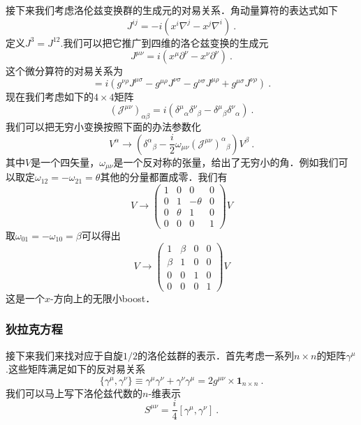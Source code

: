 接下来我们考虑洛伦兹变换群的生成元的对易关系．角动量算符的表达式如下
\begin{equation}
J^{ij} = -i (x^i\nabla^j- x^j\nabla^i)~.
\end{equation}
定义$J^3 = J^{12}$.我们可以把它推广到四维的洛仑兹变换的生成元
\begin{equation}
J^{\mu\nu} = i (x^\mu \partial^\nu - x^\nu \partial^\nu)~.
\end{equation}
这个微分算符的对易关系为
\begin{equation}
[J^{\mu\nu},J^{\rho\sigma}] = i (g^{\nu\rho}J^{\mu\sigma} - g^{\mu\rho}J^{\nu\sigma}-g^{\nu\sigma}J^{\mu\rho}+g^{\mu\sigma}J^{\nu\rho})~.
\end{equation}
现在我们考虑如下的$4\times 4$矩阵
\begin{equation}
(\mathcal J^{\mu\nu})_{\alpha\beta} = i (\delta^\mu{}_\alpha \delta^\nu{}_\beta - \delta^\mu{}_\beta \delta^\nu{}_\alpha)~.
\end{equation}
我们可以把无穷小变换按照下面的办法参数化
\begin{equation}
V^\alpha \rightarrow (\delta^\alpha{}_\beta - \frac{i}{2}\omega_{\mu\nu}(\mathcal J^{\mu\nu})^\alpha{}_\beta) V^\beta ~.
\end{equation}
其中$V$是一个四矢量，$\omega_{\mu\nu}$是一个反对称的张量，给出了无穷小的角．例如我们可以取定$\omega_{12}=-\omega_{21} = \theta$其他的分量都置成零．我们有
\begin{equation}
V \rightarrow \begin{pmatrix}
1 & 0 & 0 & 0 \\
0 & 1 & -\theta & 0 \\
0 & \theta & 1 & 0 \\
0 & 0 & 0 & 1
\end{pmatrix}
V
\end{equation}
取$\omega_{01} = -\omega_{10}=\beta$可以得出
\begin{equation}
V \rightarrow \begin{pmatrix}
1 & \beta & 0 & 0 \\
\beta & 1 & 0 & 0 \\
0 & 0 & 1 & 0 \\
0 & 0 & 0 & 1
\end{pmatrix}
V
\end{equation}
这是一个$x$-方向上的无限小boost．

\subsubsection{狄拉克方程}
接下来我们来找对应于自旋$1/2$的洛伦兹群的表示．首先考虑一系列$n\times n$的矩阵$\gamma^\mu$.这些矩阵满足如下的反对易关系
\begin{equation}
\{\gamma^\mu,\gamma^\nu\}\equiv\gamma^\mu\gamma^\nu+\gamma^\nu\gamma^\mu = 2 g^{\mu\nu} \times \boldsymbol{1}_{n\times n}~.
\end{equation}
我们可以马上写下洛伦兹代数的$n$-维表示
\begin{equation}
S^{\mu\nu} = \frac{i}{4}[\gamma^\mu,\gamma^\nu]~.
\end{equation}



